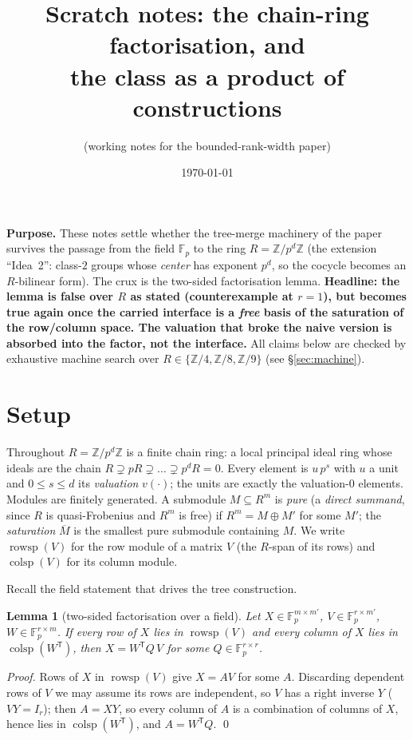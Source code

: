 \documentclass[11pt,a4paper]{article}
\title{Scratch notes: the chain-ring factorisation, and\\
the class as a product of constructions}
\author{(working notes for the bounded-rank-width paper)}
\date{\today}
\theoremstyle{plain}
\newtheorem{lemma}{Lemma}
\theoremstyle{definition}
\newcommand{\Zp}{\mathbb{Z}}
\newcommand{\R}{R}
\newcommand{\rowsp}{\operatorname{rowsp}}
\newcommand{\colsp}{\operatorname{colsp}}
\newcommand{\sat}[1]{\overline{#1}}
\newcommand{\T}{^{\mathsf T}}
\newcommand{\Fp}{\mathbb{F}_p}
\begin{document}
\maketitle

\noindent\textbf{Purpose.} These notes settle whether the tree-merge
machinery of the paper survives the passage from the field $\Fp$ to the
ring $\R = \Zp/p^{d}\Zp$ (the extension ``Idea~2'': class-$2$ groups whose
\emph{center} has exponent $p^{d}$, so the cocycle becomes an
$\R$-bilinear form). The crux is the two-sided factorisation
lemma. \textbf{Headline: the lemma is false over $\R$ as stated
(counterexample at $r=1$), but becomes true again once the carried
interface is a \emph{free} basis of the saturation of the row/column
space. The valuation that broke the naive version is absorbed into the
factor, not the interface.} All claims below are checked by exhaustive
machine search over $\R\in\{\Zp/4,\Zp/8,\Zp/9\}$ (see
\S\ref{sec:machine}).

\section{Setup}

Throughout $\R=\Zp/p^{d}\Zp$ is a finite chain ring: a local principal
ideal ring whose ideals are the chain $\R\supsetneq p\R\supsetneq\dots
\supsetneq p^{d}\R=0$. Every element is $u\,p^{s}$ with $u$ a unit and
$0\le s\le d$ its \emph{valuation} $v(\cdot)$; the units are exactly the
valuation-$0$ elements. Modules are finitely generated. A submodule
$M\subseteq \R^{m}$ is \emph{pure} (a \emph{direct summand}, since $\R$ is
quasi-Frobenius and $\R^m$ is free) if $\R^{m}=M\oplus M'$ for some $M'$;
the \emph{saturation} $\sat M$ is the smallest pure submodule containing
$M$. We write $\rowsp(V)$ for the row module of a matrix $V$ (the
$\R$-span of its rows) and $\colsp(V)$ for its column module.

Recall the field statement that drives the tree construction.

\begin{lemma}[two-sided factorisation over a field]\label{lem:field}
Let $X\in\Fp^{m\times m'}$, $V\in\Fp^{r\times m'}$, $W\in\Fp^{r\times m}$.
If every row of $X$ lies in $\rowsp(V)$ and every column of $X$ lies in
$\colsp(W\T)$, then $X=W\T Q\,V$ for some $Q\in\Fp^{r\times r}$.
\end{lemma}

\begin{proof}
Rows of $X$ in $\rowsp(V)$ give $X=AV$ for some $A$. Discarding dependent
rows of $V$ we may assume its rows are independent, so $V$ has a right
inverse $Y$ ($VY=I_r$); then $A=XY$, so every column of $A$ is a
combination of columns of $X$, hence lies in $\colsp(W\T)$, and
$A=W\T Q$. \qed
\end{proof}
\end{document}
